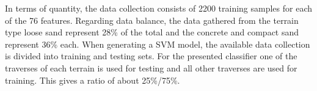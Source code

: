 In terms of quantity, the data collection consists of 2200 training samples for each of the 76 features. 
Regarding data balance, the data gathered from the terrain type loose sand represent 28\% of the total and the concrete and compact sand represent 36\% each. 
When generating a SVM model, the available data collection is divided into training and testing sets. 
For the presented classifier one of the traverses of each terrain is used for testing and all other traverses are used for training. 
This gives a ratio of about 25\%/75\%.